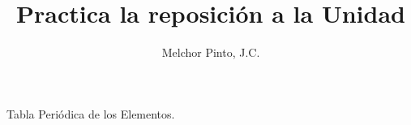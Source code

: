 \documentclass[12pt,addpoints]{repaso}
\title{Practica la reposición a la Unidad}
\author{Melchor Pinto, J.C.}
\begin{document}
\INFO%
\begin{questions}
    \questionboxed[5]{}

    \questionboxed[4]{}
    \questionboxed[4]{}


    \newpage

    \begin{multicols}{2}
    \questionboxed[5]{}
    \questionboxed[5]{}
    \end{multicols}

    \begin{multicols}{2}
    \questionboxed[5]{}
    \questionboxed[5]{}
    \end{multicols}  

    \newpage

    \begin{multicols}{2}
        \questionboxed[5]{}
        \questionboxed[5]{}
    \end{multicols}
    \questionboxed[8]{}
    \questionboxed[5]{}
    \questionboxed[5]{}
    \begin{multicols}{2}
        \questionboxed[15]{}
        \questionboxed[15]{}
    \end{multicols}
    \questionboxed[5]{}
    \questionboxed[4]{}

\end{questions}
\begin{landscape}
    \begin{minipage}[b]{\textwidth}
        \thispagestyle{foot}
        \begin{table}[H]
            \centering
            \caption{Tabla Peri\'odica de los Elementos.}
            \TablaPeriodica[0.48]
            \label{tab:periodic_table}
        \end{table}
    \end{minipage}
\end{landscape}
\end{document}
